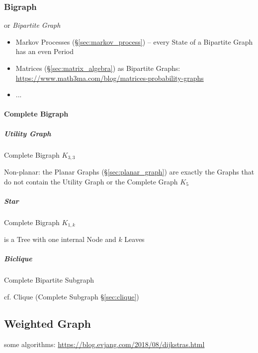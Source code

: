 \subsubsection{Bigraph}\label{sec:bigraph}

or \emph{Bipartite Graph}

\begin{itemize}
  \item Markov Processes (\S\ref{sec:markov_process}) -- every State of a
    Bipartite Graph has an even Period
  \item Matrices (\S\ref{sec:matrix_algebra}) as Bipartite Graphs:
    \url{https://www.math3ma.com/blog/matrices-probability-graphs}
  \item ...
\end{itemize}



\paragraph{Complete Bigraph}\label{sec:complete_bigraph}\hfill

\subparagraph{Utility Graph}\label{sec:utility_graph}\hfill

Complete Bigraph $K_{3,3}$

Non-planar: the Planar Graphs (\S\ref{sec:planar_graph}) are exactly the Graphs
that do not contain the Utility Graph or the Complete Graph $K_5$



\subparagraph{Star}\label{sec:star}\hfill

Complete Bigraph $K_{1,k}$

is a Tree with one internal Node and $k$ Leaves



\subparagraph{Biclique}\label{sec:biclique}\hfill

Complete Bipartite Subgraph

cf. Clique (Complete Subgraph \S\ref{sec:clique})



\subsection{Weighted Graph}\label{sec:weighted_graph}

some algorithms: \url{https://blog.evjang.com/2018/08/dijkstras.html}

